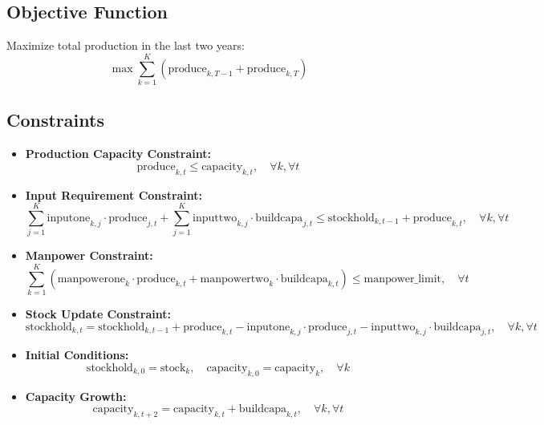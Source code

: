 \documentclass{article}
\begin{document}
\subsection*{Objective Function}
Maximize total production in the last two years:
\[
\max \sum_{k=1}^{K} \left( \text{produce}_{k,T-1} + \text{produce}_{k,T} \right)
\]

\subsection*{Constraints}
\begin{itemize}
    \item \textbf{Production Capacity Constraint:}
    \[
    \text{produce}_{k,t} \leq \text{capacity}_{k,t}, \quad \forall k, \forall t
    \]
    
    \item \textbf{Input Requirement Constraint:}
    \[
    \sum_{j=1}^{K} \text{inputone}_{k,j} \cdot \text{produce}_{j,t} + \sum_{j=1}^{K} \text{inputtwo}_{k,j} \cdot \text{buildcapa}_{j,t} \leq \text{stockhold}_{k,t-1} + \text{produce}_{k,t}, \quad \forall k, \forall t
    \]
    
    \item \textbf{Manpower Constraint:}
    \[
    \sum_{k=1}^{K} \left( \text{manpowerone}_{k} \cdot \text{produce}_{k,t} + \text{manpowertwo}_{k} \cdot \text{buildcapa}_{k,t} \right) \leq \text{manpower\_limit}, \quad \forall t
    \]
    
    \item \textbf{Stock Update Constraint:}
    \[
    \text{stockhold}_{k,t} = \text{stockhold}_{k,t-1} + \text{produce}_{k,t} - \text{inputone}_{k,j} \cdot \text{produce}_{j,t} - \text{inputtwo}_{k,j} \cdot \text{buildcapa}_{j,t}, \quad \forall k, \forall t
    \]
    
    \item \textbf{Initial Conditions:}
    \[
    \text{stockhold}_{k,0} = \text{stock}_{k}, \quad \text{capacity}_{k,0} = \text{capacity}_{k}, \quad \forall k
    \]
    
    \item \textbf{Capacity Growth:}
    \[
    \text{capacity}_{k,t+2} = \text{capacity}_{k,t} + \text{buildcapa}_{k,t}, \quad \forall k, \forall t
    \]
\end{itemize}
\end{document}
